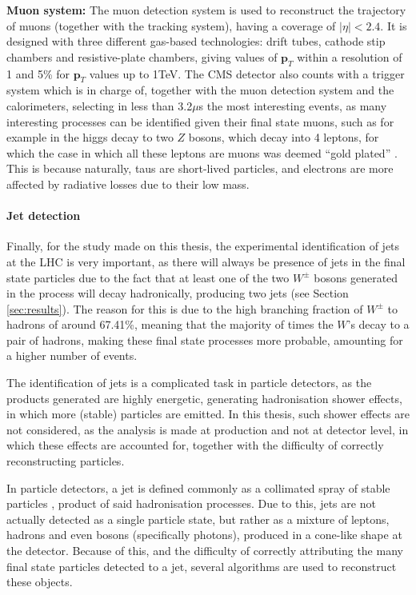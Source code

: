 \textbf{Muon system:} The muon detection system is used to reconstruct the trajectory of muons (together with the tracking system), having a coverage of $|\eta| < 2.4$. It is designed with three different gas-based technologies: drift tubes, cathode stip chambers and resistive-plate chambers, giving values of $\bm{p}_T$ within a resolution of 1 and 5\% for $\bm{p}_T$ values up to 1TeV. The CMS detector also counts with a trigger system which is in charge of, together with the muon detection system and the calorimeters, selecting in less than 3.2$\mu$s the most interesting events, as many interesting processes can be identified given their final state muons, such as for example in the higgs decay to two $Z$ bosons, which decay into 4 leptons, for which the case in which all these leptons are muons was deemed ``gold plated'' \cite{CMS}\cite{paperCMS}. This is because naturally, taus are short-lived particles, and electrons are more affected by radiative losses due to their low mass.

\paragraph{Jet detection} \label{ssec:jetsdetection}

Finally, for the study made on this thesis, the experimental identification of jets at the LHC is very important, as there will always be presence of jets in the final state particles due to the fact that at least one of the two $W^{\pm}$ bosons generated in the process will decay hadronically, producing two jets (see Section \ref{sec:results}). The reason for this is due to the high branching fraction of $W^{\pm}$ to hadrons of around 67.41\%, meaning that the majority of times the $W$'s decay to a pair of hadrons, making these final state processes more probable, amounting for a higher number of events.

The identification of jets is a complicated task in particle detectors, as the products generated are highly energetic, generating hadronisation shower effects, in which more (stable) particles are emitted. In this thesis, such shower effects are not considered, as the analysis is made at production and not at detector level, in which these effects are accounted for, together with the difficulty of correctly reconstructing particles.

In particle detectors, a jet is defined commonly as a collimated spray of stable particles \cite{jets}, product of said hadronisation processes. Due to this, jets are not actually detected as a single particle state, but rather as a mixture of leptons, hadrons and even bosons (specifically photons), produced in a cone-like shape at the detector. Because of this, and the difficulty of correctly attributing the many final state particles detected to a jet, several algorithms are used to reconstruct these objects.

